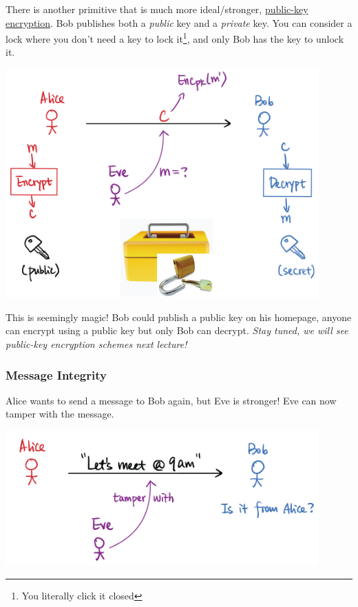 \begin{definition}
    There is another primitive that is much more ideal/stronger, \ul{public-key encryption}. Bob publishes both a \emph{public} key and a \emph{private} key. You can consider a lock where you don't need a key to lock it\footnote{You literally click it closed}, and only Bob has the key to unlock it.

    \begin{center}
        \includegraphics[width=0.9\textwidth]{images/2023-01-26/public_key.png}
    \end{center}

    This is seemingly magic! Bob could publish a public key on his homepage, anyone can encrypt using a public key but only Bob can decrypt. \emph{Stay tuned, we will see public-key encryption schemes next lecture!}
\end{definition}

\subsubsection{Message Integrity}
Alice wants to send a message to Bob again, but Eve is stronger! Eve can now tamper with the message.

\begin{center}
    \includegraphics[width=0.9\textwidth]{images/2023-01-26/integrity.png}
\end{center}

